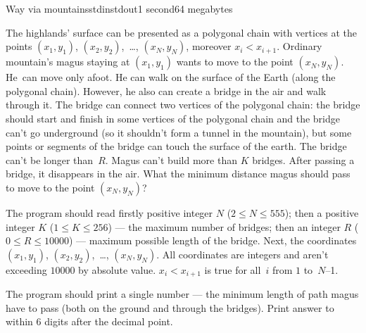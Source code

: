 \begin{problem}{Way via mountains}{stdin}{stdout}{1 second}{64 megabytes}

The highlands' surface can be presented as a polygonal chain with vertices at the points $(x_1,y_1)$, $(x_2,y_2)$,~\dots, $(x_N,y_N)$, moreover $x_i<x_{i+1}$.
Ordinary mountain's magus staying at $(x_1,y_1)$ wants to move to the point $(x_N,y_N)$. He~can move only afoot. He can walk on the surface of the Earth (along the polygonal chain). However, he also can create a bridge in the air and walk through it. The bridge can connect two vertices of the polygonal chain: the bridge should start and finish in some vertices of the polygonal chain and the bridge can't go underground (so it shouldn't form a tunnel in the mountain), but some points or segments of the bridge can touch the surface of the earth.
The bridge can't be longer than~$R$. Magus can't build more than $K$ bridges. After passing a bridge, it disappears in the air. What the minimum distance magus should pass to move to the point $(x_N,y_N)$?

\InputFile
The program should read firstly positive integer $N$ ($2\leq N\leq 555$);
then a positive integer $K$ ($1\leq K\leq 256$) ---
the maximum number of bridges;
then an integer $R$ ($0\leq R\leq 10000$) --- maximum
possible length of the bridge. Next, the coordinates $(x_1,y_1)$, $(x_2,y_2)$,~\dots, $(x_N,y_N)$.
All coordinates are integers and aren't exceeding $10000$ by absolute value.
$x_i<x_{i+1}$ is true for all~$i$ from $1$ to~$N$--1.

\OutputFile
The program should print a single number --- the minimum length of path magus have to pass (both on the ground and through the bridges).
Print answer to within 6 digits after the decimal point.

\Examples

\begin{example}
%
\end{example}

\end{problem}
